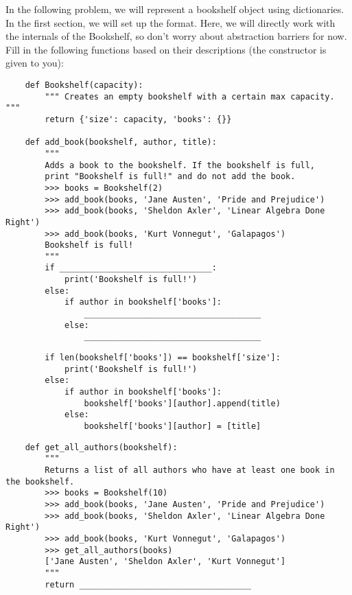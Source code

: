 
    In the following problem, we will represent 
    a bookshelf object using dictionaries.
    \newline
    \newline
    In the first section, we will set up the format. Here, we will directly work with the internals of the
    Bookshelf, so don't worry about abstraction barriers for now. Fill in the following functions based
    on their descriptions (the constructor is given to you):
    
    \begin{lstlisting}
    def Bookshelf(capacity):
        """ Creates an empty bookshelf with a certain max capacity. """
        return {'size': capacity, 'books': {}}

    def add_book(bookshelf, author, title):
        """
        Adds a book to the bookshelf. If the bookshelf is full,
        print "Bookshelf is full!" and do not add the book.
        >>> books = Bookshelf(2)
        >>> add_book(books, 'Jane Austen', 'Pride and Prejudice')
        >>> add_book(books, 'Sheldon Axler', 'Linear Algebra Done Right')
        >>> add_book(books, 'Kurt Vonnegut', 'Galapagos')
        Bookshelf is full!
        """
        if _______________________________:
            print('Bookshelf is full!')
        else:
            if author in bookshelf['books']:
                ____________________________________
            else:
                ____________________________________
    \end{lstlisting}


    \begin{solution}
        \begin{lstlisting}
        if len(bookshelf['books']) == bookshelf['size']:
            print('Bookshelf is full!')
        else:
            if author in bookshelf['books']:
                bookshelf['books'][author].append(title)
            else:
                bookshelf['books'][author] = [title]
        \end{lstlisting}
    \end{solution}

    \newpage
    \begin{lstlisting}
    def get_all_authors(bookshelf):
        """
        Returns a list of all authors who have at least one book in the bookshelf.
        >>> books = Bookshelf(10)
        >>> add_book(books, 'Jane Austen', 'Pride and Prejudice')
        >>> add_book(books, 'Sheldon Axler', 'Linear Algebra Done Right')
        >>> add_book(books, 'Kurt Vonnegut', 'Galapagos')
        >>> get_all_authors(books)
        ['Jane Austen', 'Sheldon Axler', 'Kurt Vonnegut']
        """
        return ___________________________________
    \end{lstlisting}

